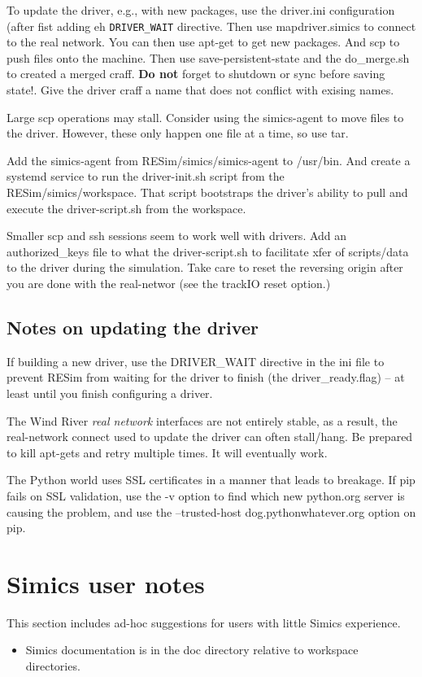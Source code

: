 \documentclass[titlepage]{article}
\begin{document}
\begin{appendices}
To update the driver, e.g., with new packages, use the driver.ini configuration (after fist adding eh {\tt DRIVER\_WAIT} directive.  Then use mapdriver.simics to connect to the real network.
You can then use apt-get to get new packages.  And scp to push files onto the machine.  Then use save-persistent-state and the do\_merge.sh to
created a merged craff.  \textbf{Do not} forget to shutdown or sync before saving state!.  Give the driver craff a name that does not conflict with exising names.

Large scp operations may stall.  Consider using the simics-agent to move files to the driver.  However,
these only happen one file at a time, so use tar.

Add the simics-agent from RESim/simics/simics-agent to /usr/bin.  And create a systemd service to run the
driver-init.sh script from the RESim/simics/workspace.  That script bootstraps the driver's ability to pull
and execute the driver-script.sh from the workspace.

Smaller scp and ssh sessions seem to work well with drivers.  Add an authorized\_keys file to what the driver-script.sh to facilitate xfer of scripts/data to the driver
during the simulation.  Take care to reset the reversing origin after you are done with the real-networ (see the trackIO reset option.)

\subsection{Notes on updating the driver}
If building a new driver, use the DRIVER\_WAIT directive in the ini file to prevent RESim from waiting for the driver to finish 
(the driver\_ready.flag) -- at least until you finish configuring a driver.

The Wind River \textit{real network} interfaces are not entirely stable, as a result, the real-network connect used to update the driver can often stall/hang.
Be prepared to kill apt-gets and retry multiple times.  It will eventually work.

The Python world uses SSL certificates in a manner that leads to breakage.  If pip fails on SSL validation, use the -v option
to find which new python.org server is causing the problem, and use the --trusted-host dog.pythonwhatever.org option on pip.

\section{Simics user notes}
This section includes ad-hoc suggestions for users with little Simics experience.
\begin{itemize}
\item Simics documentation is in the doc directory relative to workspace directories.


\end{itemize}
\end{appendices}
\end{document}

